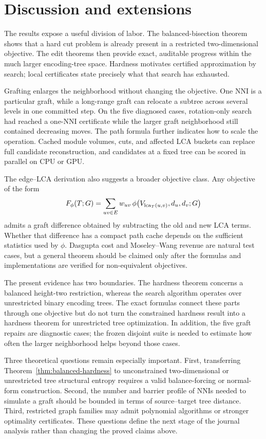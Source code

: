 \section{Discussion and extensions}\label{sec:discussion}

The results expose a useful division of labor. The balanced-bisection theorem
shows that a hard cut problem is already present in a restricted
two-dimensional objective. The edit theorems then provide exact, auditable
progress within the much larger encoding-tree space. Hardness motivates
certified approximation by search; local certificates state precisely what
that search has exhausted.

Grafting enlarges the neighborhood without changing the objective. One NNI is
a particular graft, while a long-range graft can relocate a subtree across
several levels in one committed step. On the five diagnosed cases,
rotation-only search had reached a one-NNI certificate while the larger graft
neighborhood still contained decreasing moves. The path formula further
indicates how to scale the operation. Cached module volumes, cuts, and affected
LCA buckets can replace full candidate reconstruction, and candidates at a
fixed tree can be scored in parallel on CPU or GPU.

The edge--LCA derivation also suggests a broader objective class. Any objective
of the form
\[
 F_\phi(T;G)=\sum_{uv\in E}w_{uv}\,
 \phi\!\left(V_{\operatorname{lca}_T(u,v)},d_u,d_v;G\right)
\]
admits a graft difference obtained by subtracting the old and new LCA terms.
Whether that difference has a compact path cache depends on the sufficient
statistics used by $\phi$. Dasgupta cost and Moseley--Wang revenue are natural
test cases, but a general theorem should be claimed only after the formulas and
implementations are verified for non-equivalent objectives.

The present evidence has two boundaries. The hardness theorem concerns a
balanced height-two restriction, whereas the search algorithm operates over
unrestricted binary encoding trees. The exact formulas connect these parts
through one objective but do not turn the constrained hardness result into a
hardness theorem for unrestricted tree optimization. In addition, the five
graft repairs are diagnostic cases; the frozen disjoint suite is needed to
estimate how often the larger neighborhood helps beyond those cases.

Three theoretical questions remain especially important. First, transferring
Theorem~\ref{thm:balanced-hardness} to unconstrained two-dimensional or
unrestricted tree structural entropy requires a valid balance-forcing or
normal-form construction. Second, the number and barrier profile of NNIs
needed to simulate a graft should be bounded in terms of source--target tree
distance. Third, restricted graph families may admit polynomial algorithms or
stronger optimality certificates. These questions define the next stage of
the journal analysis rather than changing the proved claims above.
